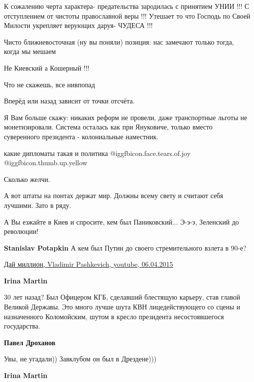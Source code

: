 \begin{itemize}

К сожалению черта характера- предательства зародилась с принятием УНИИ !!! С
отступлением от чистоты православной веры !!! Утешает то что Господь по Своей
Милости укрепляет верующих даруя- ЧУДЕСА !!!

Чисто ближневосточная (ну вы поняли) позиция: нас замечают только тогда, когда мы мешаем

Не Киевский а Кошерный !!!

Что не скажешь, все нивпопад

Вперёд или назад зависит от точки отсчёта.


Я Вам больше скажу: никаких реформ не провели, даже транспортные льготы не
монетизировали. Система осталась как при Януковиче, только вместо суверенного
президента - колониальные наместник.

какие дипломаты такая и политика @igg{fbicon.face.tears.of.joy}  @igg{fbicon.thumb.up.yellow} 

Сколько желчи.

А вот штаты на понтах держат мир. Должны всему свету и считают себя лучшими. Зато в ряду.

А Вы езжайте в Киев и спросите, кем был Паниковский... Э-э-э, Зеленский до революции!

\begin{itemize} %
\textbf{Stanislav Potapkin} А кем был Путин до своего стремительного взлета в 90-е?


\href{https://www.youtube.com/watch?v=Ao_fusFlucg}{%
Дай миллион, Vladimir Pashkevich, youtube, 06.04.2015%
}

\textbf{Irina Martin} 

30 лет назад? Был Офицером КГБ, сделавший блестящую карьеру, став главой
Великой Державы. Это много лучше шута КВН лицедействующего со сцены и
назначенного Коломойским, шутом в кресло президента несостоявшегося
государства.

\textbf{Павел Дроханов} 

Увы, не угадали)) Завклубом он был в Дрездене)))

\textbf{Irina Martin} 


\end{itemize}
\end{itemize}
